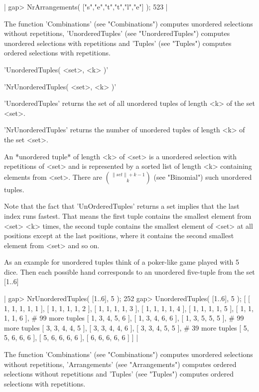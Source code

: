 |    gap> NrArrangements( ["s","e","t","t","l","e"] );
    523 |

The   function  'Combinations'  (see  "Combinations")  computes unordered
selections without repetitions, 'UnorderedTuples' (see "UnorderedTuples")
computes  unordered   selections  with   repetitions  and  'Tuples'  (see
"Tuples") computes ordered selections with repetitions.

%

'UnorderedTuples( <set>, <k> )'

'NrUnorderedTuples( <set>, <k> )'

'UnorderedTuples' returns the  set of all  unordered tuples of length <k>
of the set <set>.

'NrUnorderedTuples' returns the number of unordered  tuples of length <k>
of the set <set>.

An *unordered tuple* of length <k> of <set> is a unordered selection with
repetitions  of <set> and  is represented by a sorted  list of length <k>
containing  elements  from  <set>.   There  are ${\|set\|+k-1 \choose k}$
(see "Binomial") such unordered tuples.

Note that the fact that 'UnOrderedTuples' returns a set  implies that the
last  index runs   fastest.   That means the   first  tuple  contains the
smallest element from <set>   <k> times,  the  second tuple  contains the
smallest element of <set> at all  positions except at the last positions,
where it contains the second smallest element from <set> and so on.

As an example for unordered tuples think of a poker-like game played with
5  dice.  Then each possible hand corresponds to an  unordered five-tuple
from the set [1..6]

|    gap> NrUnorderedTuples( [1..6], 5 );
    252
    gap> UnorderedTuples( [1..6], 5 );
    [ [ 1, 1, 1, 1, 1 ], [ 1, 1, 1, 1, 2 ], [ 1, 1, 1, 1, 3 ],
      [ 1, 1, 1, 1, 4 ], [ 1, 1, 1, 1, 5 ], [ 1, 1, 1, 1, 6 ],
      # 99 more tuples
      [ 1, 3, 4, 5, 6 ], [ 1, 3, 4, 6, 6 ], [ 1, 3, 5, 5, 5 ],
      # 99 more tuples
      [ 3, 3, 4, 4, 5 ], [ 3, 3, 4, 4, 6 ], [ 3, 3, 4, 5, 5 ],
      # 39 more tuples
      [ 5, 5, 6, 6, 6 ], [ 5, 6, 6, 6, 6 ], [ 6, 6, 6, 6, 6 ] ] |

The function  'Combinations'  (see  "Combinations")   computes  unordered
selections  without  repetitions,    'Arrangements' (see  "Arrangements")
computes ordered   selections without  repetitions   and   'Tuples'  (see
"Tuples") computes ordered selections with repetitions.

